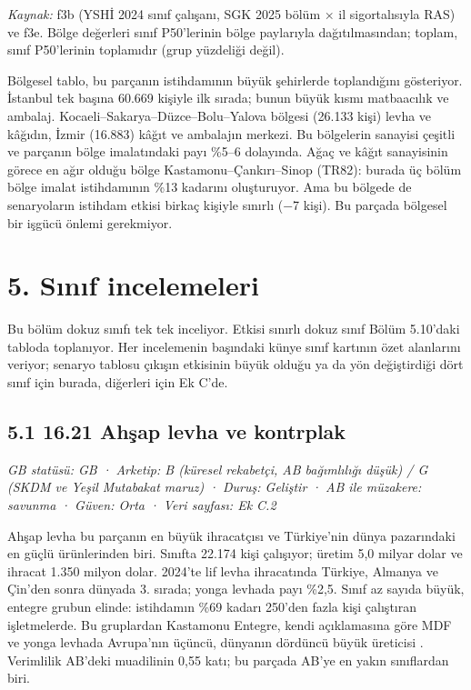 \endgroup

\emph{Kaynak:} \etiketT{} f3b (YSHİ 2024 sınıf çalışanı, SGK 2025 bölüm × il sigortalısıyla RAS) ve f3e. Bölge değerleri sınıf P50'lerinin bölge paylarıyla dağıtılmasından; toplam, sınıf P50'lerinin toplamıdır (grup yüzdeliği değil).

Bölgesel tablo, bu parçanın istihdamının büyük şehirlerde toplandığını gösteriyor. İstanbul tek başına 60.669 kişiyle ilk sırada; bunun büyük kısmı matbaacılık ve ambalaj. Kocaeli--Sakarya--Düzce--Bolu--Yalova bölgesi (26.133 kişi) levha ve kâğıdın, İzmir (16.883) kâğıt ve ambalajın merkezi. Bu bölgelerin sanayisi çeşitli ve parçanın bölge imalatındaki payı \%5--6 dolayında. Ağaç ve kâğıt sanayisinin görece en ağır olduğu bölge Kastamonu--Çankırı--Sinop (TR82): burada üç bölüm bölge imalat istihdamının \%13 kadarını oluşturuyor. Ama bu bölgede de senaryoların istihdam etkisi birkaç kişiyle sınırlı (−7 kişi). Bu parçada bölgesel bir işgücü önlemi gerekmiyor.

\hypertarget{nace_kartlar_16-18-5-sux131nux131f-incelemeleri}{%
\section{5. Sınıf incelemeleri}\label{nace_kartlar_16-18-5-sux131nux131f-incelemeleri}}

Bu bölüm dokuz sınıfı tek tek inceliyor. Etkisi sınırlı dokuz sınıf Bölüm 5.10'daki tabloda toplanıyor. Her incelemenin başındaki künye sınıf kartının özet alanlarını veriyor; senaryo tablosu çıkışın etkisinin büyük olduğu ya da yön değiştirdiği dört sınıf için burada, diğerleri için Ek C'de.

\hypertarget{nace_kartlar_16-18-51-1621-ahux15fap-levha-ve-kontrplak}{%
\subsection{5.1 16.21 Ahşap levha ve kontrplak}\label{nace_kartlar_16-18-51-1621-ahux15fap-levha-ve-kontrplak}}

\emph{GB statüsü: GB · Arketip: B (küresel rekabetçi, AB bağımlılığı düşük) / G (SKDM ve Yeşil Mutabakat maruz) · Duruş: Geliştir · AB ile müzakere: savunma · Güven: Orta · Veri sayfası: Ek C.2}

Ahşap levha bu parçanın en büyük ihracatçısı ve Türkiye'nin dünya pazarındaki en güçlü ürünlerinden biri. Sınıfta 22.174 kişi çalışıyor; üretim 5,0 milyar dolar ve ihracat 1.350 milyon dolar. 2024'te lif levha ihracatında Türkiye, Almanya ve Çin'den sonra dünyada 3. sırada; yonga levhada payı \%2,5. Sınıf az sayıda büyük, entegre grubun elinde: istihdamın \%69 kadarı 250'den fazla kişi çalıştıran işletmelerde. Bu gruplardan Kastamonu Entegre, kendi açıklamasına göre MDF ve yonga levhada Avrupa'nın üçüncü, dünyanın dördüncü büyük üreticisi \etiketD{}. Verimlilik AB'deki muadilinin 0,55 katı; bu parçada AB'ye en yakın sınıflardan biri.

